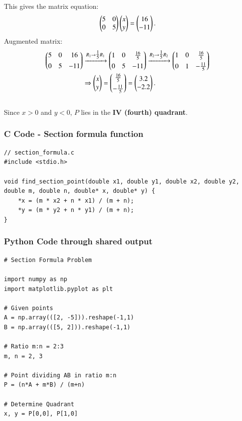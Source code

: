 \documentclass{beamer}
\begin{document}
\begin{frame}
This gives the matrix equation:
\begin{align}
\begin{pmatrix}5 & 0 \\ 0 & 5\end{pmatrix}\begin{pmatrix}x\\y\end{pmatrix} = \begin{pmatrix}16\\-11\end{pmatrix}. 
\end{align}
Augmented matrix:\\ [4pt]
\begin{align}
\begin{pmatrix}
5 & 0 & 16 \\[4pt]
0 & 5 & -11\end{pmatrix}
&\xrightarrow{R_1 \rightarrow \tfrac{1}{5}R_1}
\begin{pmatrix}
1 & 0 & \tfrac{16}{5} \\[4pt]
0 & 5 & -11\end{pmatrix}
\xrightarrow{R_2 \rightarrow \tfrac{1}{5}R_2}
\begin{pmatrix}
1 & 0 & \tfrac{16}{5} \\[4pt]
0 & 1 & -\tfrac{11}{5}\end{pmatrix}\\
&\Rightarrow \begin{pmatrix}x\\y\end{pmatrix} = \begin{pmatrix}\tfrac{16}{5}\\[4pt]-\tfrac{11}{5}\end{pmatrix} = \begin{pmatrix}3.2\\-2.2\end{pmatrix}.
\end{align}\\

Since \(x>0\) and \(y<0\), \(P\) lies in the \textbf{IV (fourth) quadrant}.

\end{frame}
	
	\begin{frame}[fragile]
		\frametitle{C Code - Section formula function }
		
		\begin{lstlisting}
// section_formula.c
#include <stdio.h>

void find_section_point(double x1, double y1, double x2, double y2, double m, double n, double* x, double* y) {
	*x = (m * x2 + n * x1) / (m + n);
	*y = (m * y2 + n * y1) / (m + n);
}
			\end{lstlisting}
		\end{frame}


\begin{frame}[fragile]
	\frametitle{Python Code through shared output}
	\begin{lstlisting}
# Section Formula Problem

import numpy as np
import matplotlib.pyplot as plt

# Given points
A = np.array(([2, -5])).reshape(-1,1)
B = np.array(([5, 2])).reshape(-1,1)

# Ratio m:n = 2:3
m, n = 2, 3

# Point dividing AB in ratio m:n
P = (n*A + m*B) / (m+n)

# Determine Quadrant
x, y = P[0,0], P[1,0]
	\end{lstlisting}
\end{frame}
\end{document}
